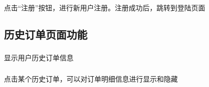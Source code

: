 \subsubsection*{}
点击“注册”按钮，进行新用户注册。注册成功后，跳转到登陆页面

\subsection{历史订单页面功能}
\subsubsection*{}
显示用户历史订单信息
\subsubsection*{}
点击某个历史订单，可以对订单明细信息进行显示和隐藏

